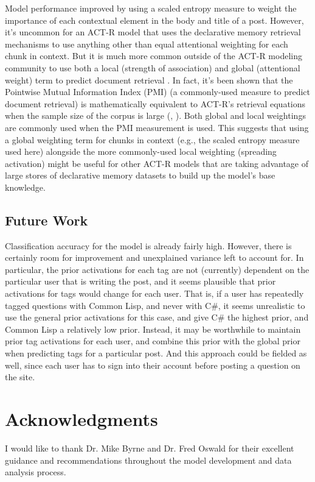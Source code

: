 \documentclass[10pt,letterpaper]{article}
\begin{document}
Model performance improved by using a scaled entropy measure to weight the importance of each contextual element in the body and title of a post.
However, it's uncommon for an ACT-R model that uses the declarative memory retrieval mechanisms to use anything other than equal attentional weighting for each chunk in context.
But it is much more common outside of the ACT-R modeling community to use both a local (strength of association) and global (attentional weight) term to predict document retrieval .
In fact, it's been shown that the Pointwise Mutual Information Index (PMI) (a commonly-used measure to predict document retrieval) is mathematically equivalent to ACT-R's retrieval equations when the sample size of the corpus is large (, ).
Both global and local weightings are commonly used when the PMI measurement is used.
This suggests that using a global weighting term for chunks in context (e.g., the scaled entropy measure used here) alongside the more commonly-used local weighting (spreading activation) might be useful for other ACT-R models that are taking advantage of large stores of declarative memory datasets to build up the model's base knowledge.

\subsection{Future Work}

Classification accuracy for the model is already fairly high.
However, there is certainly room for improvement and unexplained variance left to account for.
In particular, the prior activations for each tag are not (currently) dependent on the particular user that is writing the post, and it seems plausible that prior activations for tags would change for each user.
That is, if a user has repeatedly tagged questions with Common Lisp, and never with C\#, it seems unrealistic to use the general prior activations for this case, and give C\# the highest prior, and Common Lisp a relatively low prior.
Instead, it may be worthwhile to maintain prior tag activations for each user, and combine this prior with the global prior when predicting tags for a particular post.
And this approach could be fielded as well, since each user has to sign into their account before posting a question on the site.

\section{Acknowledgments}

I would like to thank Dr. Mike Byrne and Dr. Fred Oswald for their excellent guidance and recommendations throughout the model development and data analysis process.


\setlength{\bibleftmargin}{.125in}
\setlength{\bibindent}{-\bibleftmargin}

\end{document}
